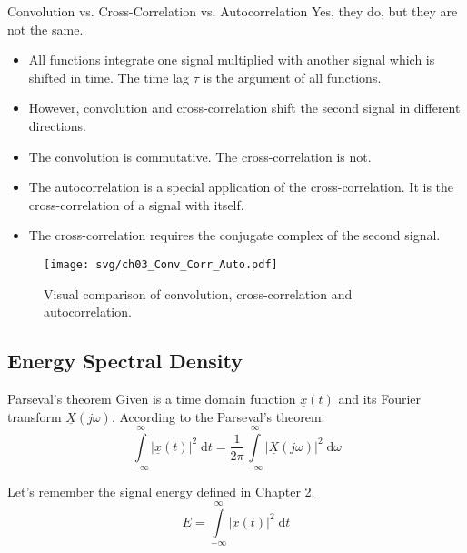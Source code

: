 \begin{refsection}
\begin{excursus}{Convolution vs. Cross-Correlation vs. Autocorrelation}
	Yes, they do, but they are not the same.
	\begin{itemize}
		\item All functions integrate one signal multiplied with another signal which is shifted in time. The time lag $\tau$ is the argument of all functions.
		\item However, convolution and cross-correlation shift the second signal in different directions.
		\item The convolution is commutative. The cross-correlation is not.
		\item The autocorrelation is a special application of the cross-correlation. It is the cross-correlation of a signal with itself.
		\item The cross-correlation requires the conjugate complex of the second signal.
	\end{itemize}

	\begin{figure}[H]
		\centering
		\texttt{[image: svg/ch03\_Conv\_Corr\_Auto.pdf]}
		\caption{Visual comparison of convolution, cross-correlation and autocorrelation. }
	\end{figure}
\end{excursus}

\subsection{Energy Spectral Density}

\begin{definition}{Parseval's theorem}
	Given is a time domain function $\underline{x}(t)$ and its Fourier transform $\underline{X}\left(j \omega\right)$. According to the  Parseval's theorem:
	\begin{equation}
		\int\limits_{-\infty}^{\infty} \left|\underline{x}(t)\right|^2 \; \mathrm{d} t = \frac{1}{2 \pi} \int\limits_{-\infty}^{\infty} \left|\underline{X}\left(j \omega\right)\right|^2 \; \mathrm{d} \omega
	\end{equation}
\end{definition}

Let's remember the signal energy defined in Chapter 2.
\begin{equation}
	E = \int\limits_{-\infty}^{\infty} \left|\underline{x}(t)\right|^2 \; \mathrm{d} t
\end{equation}


\end{refsection}
